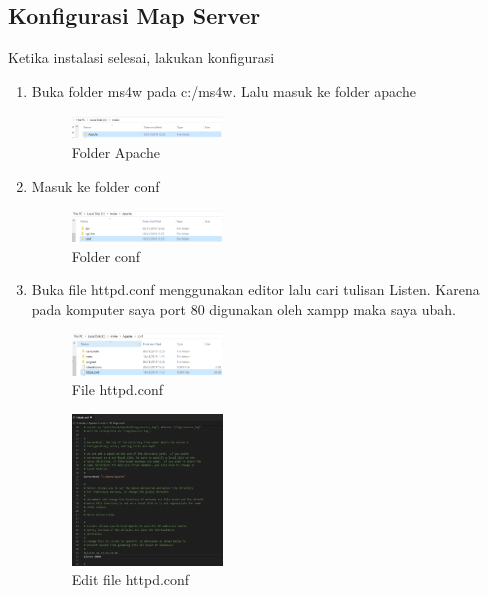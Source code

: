 \subsection{Konfigurasi Map Server}
Ketika instalasi selesai, lakukan konfigurasi
\begin{enumerate}
  \item Buka folder ms4w pada c:/ms4w. Lalu masuk ke folder apache
  \hfill\break
    \begin{figure}[H]
		\includegraphics[width=4cm]{figures/tugas4/1174084/3.png}
		\centering
		\caption{Folder Apache}
    \end{figure}


  \item Masuk ke folder conf
  \hfill\break
    \begin{figure}[H]
		\includegraphics[width=4cm]{figures/tugas4/1174084/4.png}
		\centering
		\caption{Folder conf}
    \end{figure}

  \item Buka file httpd.conf menggunakan editor lalu cari tulisan Listen. Karena pada komputer saya port 80 digunakan oleh xampp maka saya ubah.
  \hfill\break
    \begin{figure}[H]
		\includegraphics[width=4cm]{figures/tugas4/1174084/5.png}
		\centering
		\caption{File httpd.conf}
    \end{figure}

  \hfill\break
    \begin{figure}[H]
		\includegraphics[width=4cm]{figures/tugas4/1174084/6.png}
		\centering
		\caption{Edit file httpd.conf}
    \end{figure}


\end{enumerate}
